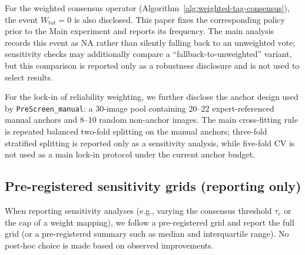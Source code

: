 For the weighted consensus operator (Algorithm~\ref{alg:weighted-tag-consensus}), the event
$W_{\mathrm{tot}}=0$ is also disclosed. This paper fixes the corresponding policy prior to the Main
experiment and reports its frequency. The main analysis records this event as NA rather than silently falling
back to an unweighted vote; sensitivity checks may additionally compare a ``fallback-to-unweighted''
variant, but this comparison is reported only as a robustness disclosure and is not used to select results.

For the lock-in of reliability weighting, we further disclose the anchor design used by
\texttt{PreScreen\_manual}: a 30-image pool containing 20--22 expert-referenced manual anchors and 8--10
random non-anchor images. The main cross-fitting rule is repeated balanced two-fold splitting on the manual
anchors; three-fold stratified splitting is reported only as a sensitivity analysis, while five-fold CV is not
used as a main lock-in protocol under the current anchor budget.

\subsection{Pre-registered sensitivity grids (reporting only)}

When reporting sensitivity analyses (e.g., varying the consensus threshold $\tau_c$ or the cap of a weight
mapping), we follow a pre-registered grid and report the full grid (or a pre-registered summary such as
median and interquartile range). No post-hoc choice is made based on observed improvements.
